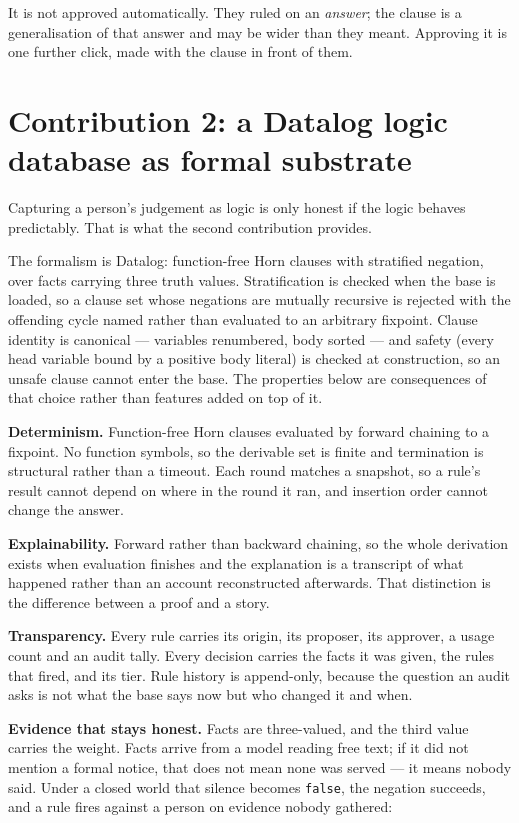 \documentclass[sigconf,nonacm]{acmart}
\begin{document}
\noindent It is not approved automatically. They ruled on an \emph{answer}; the
clause is a generalisation of that answer and may be wider than they meant.
Approving it is one further click, made with the clause in front of them.

\section{Contribution 2: a Datalog logic database as formal substrate}

Capturing a person's judgement as logic is only honest if the logic behaves
predictably. That is what the second contribution provides.

The formalism is Datalog: function-free Horn clauses with stratified negation,
over facts carrying three truth values. Stratification is checked when the base
is loaded, so a clause set whose negations are mutually recursive is rejected
with the offending cycle named rather than evaluated to an arbitrary fixpoint.
Clause identity is canonical --- variables renumbered, body sorted --- and
safety (every head variable bound by a positive body literal) is checked at
construction, so an unsafe clause cannot enter the base. The properties below
are consequences of that choice rather than features added on top of it.

\textbf{Determinism.} Function-free Horn clauses evaluated by forward chaining
to a fixpoint. No function symbols, so the derivable set is finite and
termination is structural rather than a timeout. Each round matches a snapshot,
so a rule's result cannot depend on where in the round it ran, and insertion
order cannot change the answer.

\textbf{Explainability.} Forward rather than backward chaining, so the whole
derivation exists when evaluation finishes and the explanation is a transcript
of what happened rather than an account reconstructed afterwards. That
distinction is the difference between a proof and a story.

\textbf{Transparency.} Every rule carries its origin, its proposer, its
approver, a usage count and an audit tally. Every decision carries the facts it
was given, the rules that fired, and its tier. Rule history is append-only,
because the question an audit asks is not what the base says now but who changed
it and when.

\textbf{Evidence that stays honest.} Facts are three-valued, and the third value
carries the weight. Facts arrive from a model reading free text; if it did not
mention a formal notice, that does not mean none was served --- it means nobody
said. Under a closed world that silence becomes \texttt{false}, the negation
succeeds, and a rule fires against a person on evidence nobody gathered:
\end{document}
